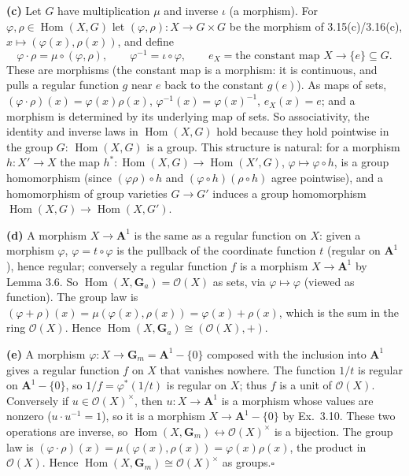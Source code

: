 \documentclass[11pt]{article}
\begin{document}
\textbf{(c)} Let $G$ have multiplication $\mu$ and inverse $\iota$ (a morphism). For $\varphi,\rho\in\operatorname{Hom}(X,G)$ let $(\varphi,\rho)\colon X\to G\times G$ be the morphism of 3.15(c)/3.16(c), $x\mapsto(\varphi(x),\rho(x))$, and define
\[
\varphi\cdot\rho=\mu\circ(\varphi,\rho),\qquad \varphi^{-1}=\iota\circ\varphi,\qquad e_X=\text{the constant map }X\to\{e\}\subseteq G.
\]
These are morphisms (the constant map is a morphism: it is continuous, and pulls a regular function $g$ near $e$ back to the constant $g(e)$). As maps of sets, $(\varphi\cdot\rho)(x)=\varphi(x)\rho(x)$, $\varphi^{-1}(x)=\varphi(x)^{-1}$, $e_X(x)=e$; and a morphism is determined by its underlying map of sets. So associativity, the identity and inverse laws in $\operatorname{Hom}(X,G)$ hold because they hold pointwise in the group $G$: $\operatorname{Hom}(X,G)$ is a group. This structure is natural: for a morphism $h\colon X'\to X$ the map $h^*\colon\operatorname{Hom}(X,G)\to\operatorname{Hom}(X',G)$, $\varphi\mapsto\varphi\circ h$, is a group homomorphism (since $(\varphi\rho)\circ h$ and $(\varphi\circ h)(\rho\circ h)$ agree pointwise), and a homomorphism of group varieties $G\to G'$ induces a group homomorphism $\operatorname{Hom}(X,G)\to\operatorname{Hom}(X,G')$.

\textbf{(d)} A morphism $X\to\mathbf A^1$ is the same as a regular function on $X$: given a morphism $\varphi$, $\varphi=t\circ\varphi$ is the pullback of the coordinate function $t$ (regular on $\mathbf A^1$), hence regular; conversely a regular function $f$ is a morphism $X\to\mathbf A^1$ by Lemma 3.6. So $\operatorname{Hom}(X,\mathbf G_a)=\mathcal{O}(X)$ as sets, via $\varphi\mapsto\varphi$ (viewed as function). The group law is $(\varphi+\rho)(x)=\mu(\varphi(x),\rho(x))=\varphi(x)+\rho(x)$, which is the sum in the ring $\mathcal{O}(X)$. Hence $\operatorname{Hom}(X,\mathbf G_a)\cong(\mathcal{O}(X),+)$.

\textbf{(e)} A morphism $\varphi\colon X\to\mathbf G_m=\mathbf A^1-\{0\}$ composed with the inclusion into $\mathbf A^1$ gives a regular function $f$ on $X$ that vanishes nowhere. The function $1/t$ is regular on $\mathbf A^1-\{0\}$, so $1/f=\varphi^*(1/t)$ is regular on $X$; thus $f$ is a unit of $\mathcal{O}(X)$. Conversely if $u\in\mathcal{O}(X)^\times$, then $u\colon X\to\mathbf A^1$ is a morphism whose values are nonzero ($u\cdot u^{-1}=1$), so it is a morphism $X\to\mathbf A^1-\{0\}$ by Ex.~3.10. These two operations are inverse, so $\operatorname{Hom}(X,\mathbf G_m)\leftrightarrow\mathcal{O}(X)^\times$ is a bijection. The group law is $(\varphi\cdot\rho)(x)=\mu(\varphi(x),\rho(x))=\varphi(x)\rho(x)$, the product in $\mathcal{O}(X)$. Hence $\operatorname{Hom}(X,\mathbf G_m)\cong\mathcal{O}(X)^\times$ as groups.\hfill$\square$
\end{document}
